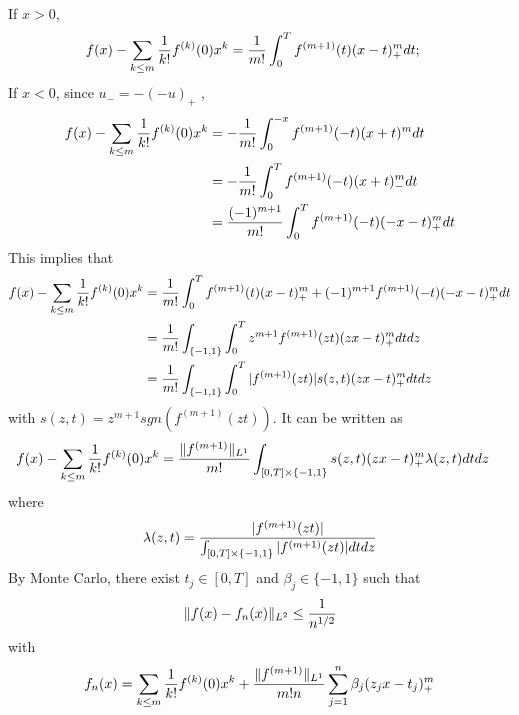 \vspace{1cm}
If $x>0$,
\begin{equation}
\begin{aligned}
f(x) - \sum_{k\le m}{1\over k!}f^{(k)}(0) x^k &={1\over m!}\int_0^T f^{(m+1)}(t)(x-t)_+^mdt;
\end{aligned}
\end{equation}
If $x<0$, since $u_-=-(-u)_+$ ,
\begin{equation}
\begin{aligned}
f(x) - \sum_{k\le m}{1\over k!}f^{(k)}(0) x^k &=-{1\over m!}\int_0^{-x} f^{(m+1)}(-t)(x+t)^mdt
\\
&=-{1\over m!}\int_0^T f^{(m+1)}(-t)(x+t)_-^mdt
\\
&={(-1)^{m+1}\over m!}\int_0^T f^{(m+1)}(-t)(-x-t)_+^mdt
\end{aligned}
\end{equation}
This implies that
\begin{equation}
\begin{aligned}
f(x) - \sum_{k\le m}{1\over k!}f^{(k)}(0) x^k 
&={1\over m!}\int_0^T f^{(m+1)}(t)(x-t)_+^m + (-1)^{m+1}f^{(m+1)}(-t)(-x-t)_+^mdt
\\
&={1\over m!}\int_{\{-1,1\}}\int_0^T z^{m+1}f^{(m+1)}(zt)(zx-t)_+^m dtdz
\\
&={1\over m!}\int_{\{-1,1\}}\int_0^T |f^{(m+1)}(zt)| s(z, t)(zx-t)_+^m dtdz
\end{aligned}
\end{equation}
with $s(z, t)= z^{m+1}sgn (f^{(m+1)}(zt))$.
It can be written as 
\begin{equation}
\begin{aligned}
f(x) - \sum_{k\le m}{1\over k!}f^{(k)}(0) x^k &={\|f^{(m+1)}\|_{L^1}\over m!}\int_{[0,T]\times \{-1, 1\}}s(z,t)(zx-t)_+^m \lambda(z,t)dtdz
\end{aligned}
\end{equation}
where 
\begin{equation}
\begin{aligned}
\lambda(z,t)={|f^{(m+1)}(zt)|\over \int_{[0,T]\times \{-1, 1\}} |f^{(m+1)}(zt)| dt dz}
\end{aligned}
\end{equation}
By Monte Carlo, there exist $t_j\in [0, T]$ and $\beta_j\in \{-1, 1\}$ such that
\begin{equation}
\begin{aligned}
\|f(x) - f_n(x)\|_{L^2} \le {1\over n^{1/2}}
\end{aligned}
\end{equation}
with
\begin{equation}
\begin{aligned}
f_n(x) = \sum_{k\le m}{1\over k!}f^{(k)}(0) x^k + {\|f^{(m+1)}\|_{L^1}\over m!n}\sum_{j=1}^n\beta_j (z_jx-t_j)_+^m
\end{aligned}
\end{equation}

